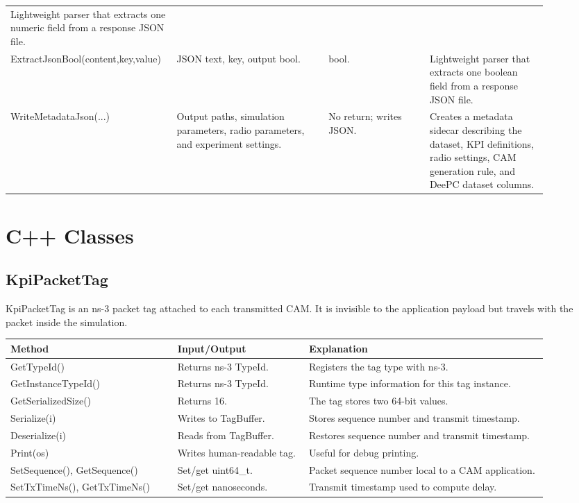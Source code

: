 \documentclass[11pt]{article}
\DeclareRobustCommand{\code}[1]{\texttt{\detokenize{#1}}}
\def\code#1{#1}%
\begin{document}
\begin{center}
\begin{longtable}{L{0.24\linewidth}L{0.27\linewidth}L{0.18\linewidth}L{0.21\linewidth}}
Lightweight parser that extracts one numeric field from a response JSON file. \\
\code{ExtractJsonBool(content,key,value)} &
JSON text, key, output bool. &
\code{bool}. &
Lightweight parser that extracts one boolean field from a response JSON file. \\
\code{WriteMetadataJson(...)} &
Output paths, simulation parameters, radio parameters, and experiment settings. &
No return; writes JSON. &
Creates a metadata sidecar describing the dataset, KPI definitions, radio
settings, CAM generation rule, and DeePC dataset columns. \\
\bottomrule
\end{longtable}
\end{center}

\section{C++ Classes}

\subsection{\code{KpiPacketTag}}

\code{KpiPacketTag} is an ns-3 packet tag attached to each transmitted CAM.  It
is invisible to the application payload but travels with the packet inside the
simulation.

\begin{center}
\begin{tabular}{L{0.28\linewidth}L{0.22\linewidth}L{0.40\linewidth}}
\toprule
Method & Input/Output & Explanation \\
\midrule
\code{GetTypeId()} &
Returns ns-3 \code{TypeId}. &
Registers the tag type with ns-3. \\
\code{GetInstanceTypeId()} &
Returns ns-3 \code{TypeId}. &
Runtime type information for this tag instance. \\
\code{GetSerializedSize()} &
Returns \code{16}. &
The tag stores two 64-bit values. \\
\code{Serialize(i)} &
Writes to \code{TagBuffer}. &
Stores sequence number and transmit timestamp. \\
\code{Deserialize(i)} &
Reads from \code{TagBuffer}. &
Restores sequence number and transmit timestamp. \\
\code{Print(os)} &
Writes human-readable tag. &
Useful for debug printing. \\
\code{SetSequence()}, \code{GetSequence()} &
Set/get \code{uint64_t}. &
Packet sequence number local to a CAM application. \\
\code{SetTxTimeNs()}, \code{GetTxTimeNs()} &
Set/get nanoseconds. &
Transmit timestamp used to compute delay. \\
\bottomrule
\end{tabular}
\end{center}
\end{document}

